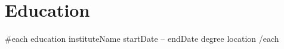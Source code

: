 \section{Education}
  \resumeSubHeadingListStart
    {{#each education}}
    \resumeSubheading
      { {{instituteName}} }{ {{startDate}} -- {{endDate}} }
      { {{degree}} }{ {{location}} }
    {{/each}}
  \resumeSubHeadingListEnd
